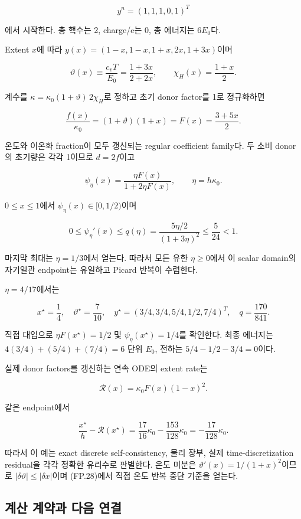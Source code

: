 \[
y^n=(1,1,1,0,1)^T
\tag{FP.45}
\]

에서 시작한다. 총 핵수는 2, charge/e는 0, 총 에너지는 \(6E_0\)다.

Extent \(x\)에 따라 \(y(x)=(1-x,1-x,1+x,2x,1+3x)\)이며

\[
\vartheta(x)\equiv\frac{c_vT}{E_0}
=\frac{1+3x}{2+2x},\qquad
\chi_H(x)=\frac{1+x}{2}.
\tag{FP.46}
\]

계수를 \(\kappa=\kappa_0(1+\vartheta)\,2\chi_H\)로 정하고 초기 donor factor를 1로 정규화하면

\[
\frac{f(x)}{\kappa_0}
=(1+\vartheta)(1+x)
=F(x)=\frac{3+5x}{2}.
\tag{FP.47}
\]

온도와 이온화 fraction이 모두 갱신되는 regular coefficient family다. 두 소비 donor의 초기량은 각각 1이므로 \(d=2f\)이고

\[
\psi_\eta(x)=\frac{\eta F(x)}{1+2\eta F(x)},
\qquad \eta=h\kappa_0 .
\tag{FP.48}
\]

\(0\le x\le1\)에서 \(\psi_\eta(x)\in[0,1/2)\)이며

\[
0\le\psi_\eta'(x)
\le
q(\eta)=\frac{5\eta/2}{(1+3\eta)^2}
\le \frac5{24}<1.
\tag{FP.49}
\]

마지막 최대는 \(\eta=1/3\)에서 얻는다. 따라서 모든 유한 \(\eta\ge0\)에서 이 scalar domain의 자기일관 endpoint는 유일하고 Picard 반복이 수렴한다.

\(\eta=4/17\)에서는

\[
\boxed{
x^\star=\frac14,\quad
\vartheta^\star=\frac7{10},\quad
y^\star=(3/4,3/4,5/4,1/2,7/4)^T,\quad
q=\frac{170}{841}.
}
\tag{FP.50}
\]

직접 대입으로 \(\eta F(x^\star)=1/2\) 및 \(\psi_\eta(x^\star)=1/4\)를 확인한다. 최종 에너지는 \(4(3/4)+(5/4)+(7/4)=6\) 단위 \(E_0\), 전하는 \(5/4-1/2-3/4=0\)이다.

실제 donor factors를 갱신하는 연속 ODE의 extent rate는

\[
\mathcal R(x)=\kappa_0F(x)(1-x)^2 .
\]

같은 endpoint에서

\[
\boxed{
\frac{x^\star}{h}-\mathcal R(x^\star)
=
\frac{17}{16}\kappa_0-\frac{153}{128}\kappa_0
=
-\frac{17}{128}\kappa_0.
}
\tag{FP.51}
\]

따라서 이 예는 exact discrete self-consistency, 물리 장부, 실제 time-discretization residual을 각각 정확한 유리수로 판별한다. 온도 미분은 \(\vartheta'(x)=1/(1+x)^2\)이므로 \(|\delta\vartheta|\le|\delta x|\)이며 (FP.28)에서 직접 온도 반복 중단 기준을 얻는다.

\hypertarget{uxacc4uxc0b0-uxacc4uxc57duxacfc-uxb2e4uxc74c-uxc5f0uxacb0}{%
\subsection{계산 계약과 다음 연결}\label{uxacc4uxc0b0-uxacc4uxc57duxacfc-uxb2e4uxc74c-uxc5f0uxacb0}}

